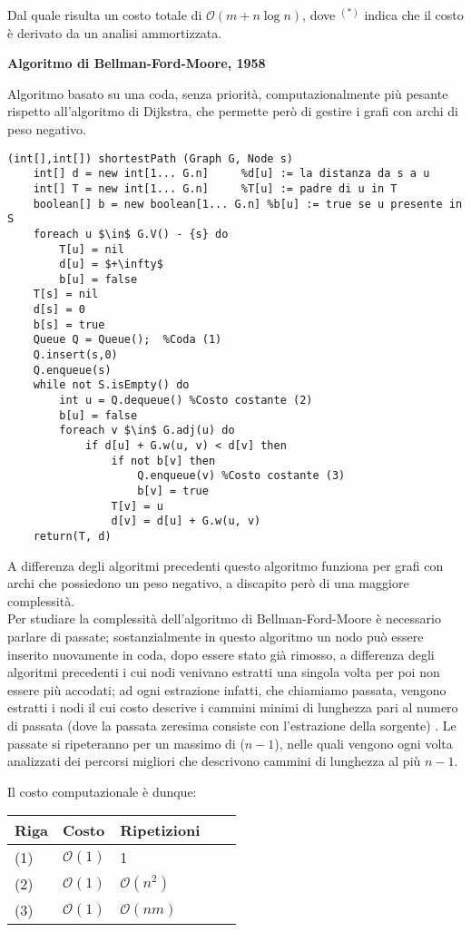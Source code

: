 \documentclass[../cheatSheetAlgoritmi.tex]{subfiles}
\begin{document}
\bigskip
Dal quale risulta un costo totale di $\mathcal{O}(m + n \log n)$, dove $^{(*)}$ indica che il costo è derivato da un analisi ammortizzata.
\newpage
\begin{flushleft}
\textbf{Algoritmo di Bellman-Ford-Moore, 1958}
\end{flushleft}
Algoritmo basato su una coda, senza priorità, computazionalmente più pesante rispetto all'algoritmo di Dijkstra, che permette però di gestire i grafi con archi di peso negativo.
\begin{lstlisting}[caption=Algoritmo di Bellman-Ford-Moore: cammini minimi a sorgente singola]
(int[],int[]) shortestPath (Graph G, Node s)
	int[] d = new int[1... G.n]		%d[u] := la distanza da s a u 
	int[] T = new int[1... G.n]		%T[u] := padre di u in T
	boolean[] b = new boolean[1... G.n]	%b[u] := true se u presente in S 
	foreach u $\in$ G.V() - {s} do
		T[u] = nil
		d[u] = $+\infty$
		b[u] = false
	T[s] = nil
	d[s] = 0
	b[s] = true
	Queue Q = Queue();	%Coda (1)
	Q.insert(s,0)
	Q.enqueue(s)
	while not S.isEmpty() do 
		int u = Q.dequeue()	%Costo costante (2)
		b[u] = false
		foreach v $\in$ G.adj(u) do
			if d[u] + G.w(u, v) < d[v] then 
				if not b[v] then
					Q.enqueue(v) %Costo costante (3)
					b[v] = true
				T[v] = u 
				d[v] = d[u] + G.w(u, v)
	return(T, d)
\end{lstlisting}
A differenza degli algoritmi precedenti questo algoritmo funziona per grafi con archi che possiedono un peso negativo, a discapito però di una maggiore complessità. \\
Per studiare la complessità dell'algoritmo di Bellman-Ford-Moore è necessario parlare di passate; sostanzialmente in questo algoritmo un nodo può essere inserito nuovamente in coda, dopo essere stato già rimosso, a differenza degli algoritmi precedenti i cui nodi venivano estratti una singola volta per poi non essere più accodati; ad ogni estrazione infatti, che chiamiamo passata, vengono estratti i nodi il cui costo descrive i cammini minimi di lunghezza pari al numero di passata (dove la passata zeresima consiste con l'estrazione della sorgente) . Le passate si ripeteranno per un massimo di ($n-1$), nelle quali vengono ogni volta analizzati dei percorsi migliori che descrivono cammini di lunghezza al più $n - 1$. 

\bigskip
Il costo computazionale è dunque:

\bigskip
\begin{tabular}{@{}lllll@{}}
\toprule
Riga & Costo & Ripetizioni &  &  \\ \midrule
(1) & $\mathcal{O}(1)$     & 1           &  &  \\
(2)    & $\mathcal{O}(1)$     & $\mathcal{O}(n^2)$           &  &  \\
(3)    & $\mathcal{O}(1)$     & $\mathcal{O}(nm)$           &  &  \\ \bottomrule
\end{tabular}
\end{document}
